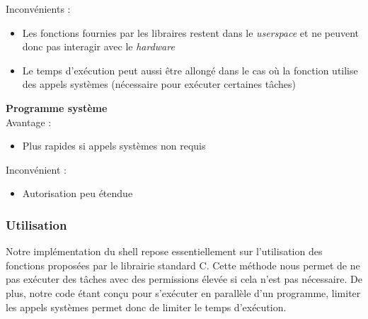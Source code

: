 \documentclass[10pt,a4paper]{article}
\begin{document}
Inconvénients :
\begin{itemize}
\item Les fonctions fournies par les libraires restent dans le \textit{userspace} et ne peuvent donc pas interagir avec le \textit{hardware}

\item Le temps d'exécution peut aussi être allongé dans le cas où la fonction utilise des appels systèmes (nécessaire pour exécuter certaines tâches)
\end{itemize}


\textbf{Programme système\\}
Avantage :
\begin{itemize}
\item Plus rapides si appels systèmes non requis
\end{itemize}

Inconvénient : 
\begin{itemize}
\item Autorisation peu étendue 
\end{itemize}

\subsubsection{Utilisation}
Notre implémentation du shell repose essentiellement sur l'utilisation des fonctions proposées par le librairie standard C. Cette méthode nous permet de ne pas exécuter des tâches avec des permissions élevée si cela n'est pas nécessaire. De plus, notre code étant conçu pour s'exécuter en parallèle d'un programme, limiter les appels systèmes permet donc de limiter le temps d'exécution. 
\end{document}
